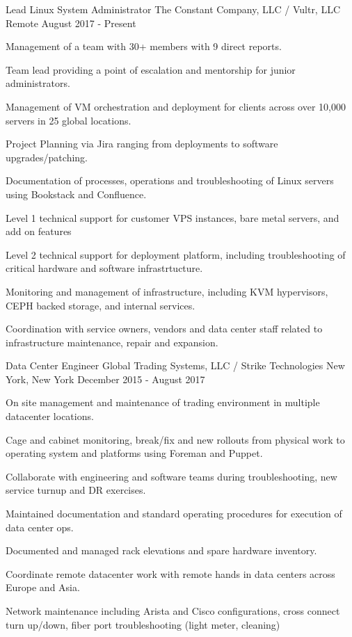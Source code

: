 
\begin{cventries}

	\cventry
	{Lead Linux System Administrator}
	{The Constant Company, LLC / Vultr, LLC}
	{Remote}
	{August 2017 - Present}
	{
		\begin{cvitems}
		\item {Management of a team with 30+ members with 9 direct reports.}
		\item {Team lead providing a point of escalation and mentorship for junior administrators.}
		\item {Management of VM orchestration and deployment for clients across over 10,000 servers in 25 global locations.}
		\item {Project Planning via Jira ranging from deployments to software upgrades/patching.}
		\item {Documentation of processes, operations and troubleshooting of Linux servers using Bookstack and Confluence.}
		\item {Level 1 technical support for customer VPS instances, bare metal servers, and add on features}
		\item {Level 2 technical support for deployment platform, including troubleshooting of critical hardware and software infrastrtucture.}
		\item {Monitoring and management of infrastructure, including KVM hypervisors,  CEPH backed storage, and internal services.}
		\item {Coordination with service owners, vendors and data center staff related to infrastructure maintenance, repair and expansion.}
		\end{cvitems}
	}


	\cventry
	{Data Center Engineer}
	{Global Trading Systems, LLC / Strike Technologies}
	{New York, New York}
	{December 2015 - August 2017}
	{
		\begin{cvitems}
		\item {On site management and maintenance of trading environment in multiple datacenter locations.}
		\item {Cage and cabinet monitoring, break/fix and new rollouts from physical work to operating system and platforms using Foreman and Puppet.}
		\item {Collaborate with engineering and software teams during troubleshooting, new service turnup and DR exercises.}
		\item {Maintained documentation and standard operating procedures for execution of data center ops.}
		\item {Documented and managed rack elevations and spare hardware inventory.}
		\item {Coordinate remote datacenter work with remote hands in data centers across Europe and Asia.}
		\item {Network maintenance including Arista and Cisco configurations, cross connect turn up/down, fiber port troubleshooting (light meter, cleaning)}
		\end{cvitems}
	}


\end{cventries}
